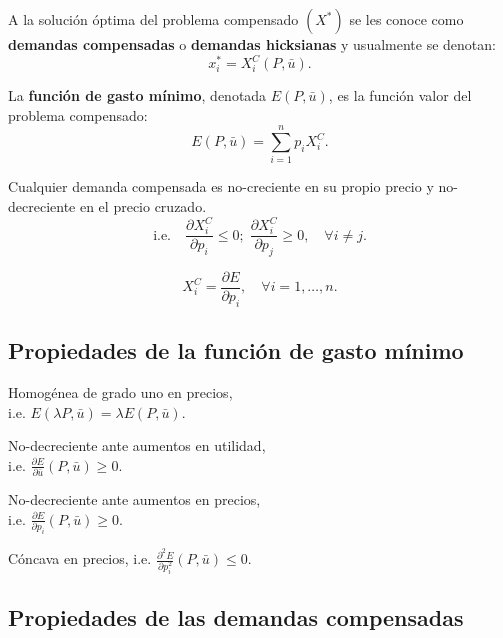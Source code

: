 \documentclass[8pt,a4paper]{extarticle}
\begin{document}
\begin{multicols}{3}
	\begin{boxdef}
		A la solución óptima del problema compensado $(X^*)$ se les conoce como \textbf{demandas compensadas} o \textbf{demandas hicksianas} y usualmente se denotan:
		\[
			x_i^* = X_i^C (P, \bar{u})
			.\]
	\end{boxdef}

	\begin{boxdef}
		La \textbf{función de gasto mínimo}, denotada $E(P, \bar{u})$, es la función valor del problema compensado:
		\[
			E(P, \bar{u}) = \sum_{i=1}^{n} p_i X_i^C
			.\]
	\end{boxdef}

	\begin{boxtheo}
		Cualquier demanda compensada es no-creciente en su propio precio y no-decreciente en el precio cruzado. \\
		$$\text{i.e.} \quad \frac{\partial X_i^C}{\partial p_i} \le 0; \; \frac{\partial X_i^C}{\partial p_j} \ge 0, \quad \forall i \neq j.$$
	\end{boxtheo}

	\begin{boxlemma}
		\[
			X^C_i = \frac{\partial E}{\partial p_i}, \quad \forall i = 1, \ldots, n
			.\]
	\end{boxlemma}

	\subsection{Propiedades de la función de gasto mínimo}

	\begin{eqlist}
		\item Homogénea de grado uno en precios, \\ i.e. $E(\lambda P, \bar{u}) = \lambda E (P, \bar{u})$.
		\item No-decreciente ante aumentos en utilidad, \\ i.e. $\displaystyle \frac{\partial E}{\partial \bar{u}} (P, \bar{u}) \geq  0$.
		\item No-decreciente ante aumentos en precios, \\ i.e. $\displaystyle \frac{\partial E}{\partial p_i} (P, \bar{u}) \geq 0$.
		\item Cóncava en precios, i.e. $\displaystyle \frac{\partial^2 E}{\partial p_i^2} (P, \bar{u}) \le 0$.
	\end{eqlist}

	\subsection{Propiedades de las demandas compensadas}


\end{multicols}
\end{document}
